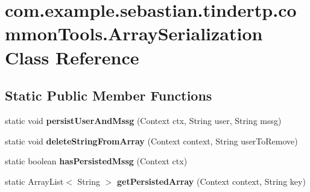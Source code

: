 \hypertarget{classcom_1_1example_1_1sebastian_1_1tindertp_1_1commonTools_1_1ArraySerialization}{}\section{com.\+example.\+sebastian.\+tindertp.\+common\+Tools.\+Array\+Serialization Class Reference}
\label{classcom_1_1example_1_1sebastian_1_1tindertp_1_1commonTools_1_1ArraySerialization}
\subsection*{Static Public Member Functions}
\begin{DoxyCompactItemize}
\item 
static void {\bfseries persist\+User\+And\+Mssg} (Context ctx, String user, String mssg)\hypertarget{classcom_1_1example_1_1sebastian_1_1tindertp_1_1commonTools_1_1ArraySerialization_a78c724ccfa96d1a6c168f7a4d417acb1}{}\label{classcom_1_1example_1_1sebastian_1_1tindertp_1_1commonTools_1_1ArraySerialization_a78c724ccfa96d1a6c168f7a4d417acb1}

\item 
static void {\bfseries delete\+String\+From\+Array} (Context context, String user\+To\+Remove)\hypertarget{classcom_1_1example_1_1sebastian_1_1tindertp_1_1commonTools_1_1ArraySerialization_aec11c0960c8ad2eea8e61aee8e22b276}{}\label{classcom_1_1example_1_1sebastian_1_1tindertp_1_1commonTools_1_1ArraySerialization_aec11c0960c8ad2eea8e61aee8e22b276}

\item 
static boolean {\bfseries has\+Persisted\+Mssg} (Context ctx)\hypertarget{classcom_1_1example_1_1sebastian_1_1tindertp_1_1commonTools_1_1ArraySerialization_a00bd808527962e2a8dc4e61fa0790129}{}\label{classcom_1_1example_1_1sebastian_1_1tindertp_1_1commonTools_1_1ArraySerialization_a00bd808527962e2a8dc4e61fa0790129}

\item 
static Array\+List$<$ String $>$ {\bfseries get\+Persisted\+Array} (Context context, String key)\hypertarget{classcom_1_1example_1_1sebastian_1_1tindertp_1_1commonTools_1_1ArraySerialization_aab5218831832e2dfd0807177e139225d}{}\label{classcom_1_1example_1_1sebastian_1_1tindertp_1_1commonTools_1_1ArraySerialization_aab5218831832e2dfd0807177e139225d}

\end{DoxyCompactItemize}
